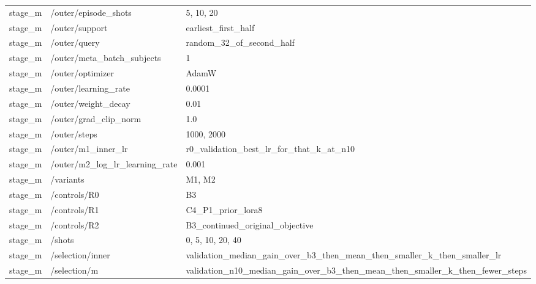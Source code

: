 \begin{longtable}{p{.65in}p{2.8in}p{3.2in}}
stage\_\allowbreak{}m & /outer/episode\_\allowbreak{}shots & 5, 10, 20 \\
stage\_\allowbreak{}m & /outer/support & earliest\_\allowbreak{}first\_\allowbreak{}half \\
stage\_\allowbreak{}m & /outer/query & random\_\allowbreak{}32\_\allowbreak{}of\_\allowbreak{}second\_\allowbreak{}half \\
stage\_\allowbreak{}m & /outer/meta\_\allowbreak{}batch\_\allowbreak{}subjects & 1 \\
stage\_\allowbreak{}m & /outer/optimizer & AdamW \\
stage\_\allowbreak{}m & /outer/learning\_\allowbreak{}rate & 0.0001 \\
stage\_\allowbreak{}m & /outer/weight\_\allowbreak{}decay & 0.01 \\
stage\_\allowbreak{}m & /outer/grad\_\allowbreak{}clip\_\allowbreak{}norm & 1.0 \\
stage\_\allowbreak{}m & /outer/steps & 1000, 2000 \\
stage\_\allowbreak{}m & /outer/m1\_\allowbreak{}inner\_\allowbreak{}lr & r0\_\allowbreak{}validation\_\allowbreak{}best\_\allowbreak{}lr\_\allowbreak{}for\_\allowbreak{}that\_\allowbreak{}k\_\allowbreak{}at\_\allowbreak{}n10 \\
stage\_\allowbreak{}m & /outer/m2\_\allowbreak{}log\_\allowbreak{}lr\_\allowbreak{}learning\_\allowbreak{}rate & 0.001 \\
stage\_\allowbreak{}m & /variants & M1, M2 \\
stage\_\allowbreak{}m & /controls/R0 & B3 \\
stage\_\allowbreak{}m & /controls/R1 & C4\_\allowbreak{}P1\_\allowbreak{}prior\_\allowbreak{}lora8 \\
stage\_\allowbreak{}m & /controls/R2 & B3\_\allowbreak{}continued\_\allowbreak{}original\_\allowbreak{}objective \\
stage\_\allowbreak{}m & /shots & 0, 5, 10, 20, 40 \\
stage\_\allowbreak{}m & /selection/inner & validation\_\allowbreak{}median\_\allowbreak{}gain\_\allowbreak{}over\_\allowbreak{}b3\_\allowbreak{}then\_\allowbreak{}mean\_\allowbreak{}then\_\allowbreak{}smaller\_\allowbreak{}k\_\allowbreak{}then\_\allowbreak{}smaller\_\allowbreak{}lr \\
stage\_\allowbreak{}m & /selection/m & validation\_\allowbreak{}n10\_\allowbreak{}median\_\allowbreak{}gain\_\allowbreak{}over\_\allowbreak{}b3\_\allowbreak{}then\_\allowbreak{}mean\_\allowbreak{}then\_\allowbreak{}smaller\_\allowbreak{}k\_\allowbreak{}then\_\allowbreak{}fewer\_\allowbreak{}steps \\

\end{longtable}
